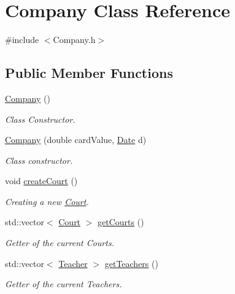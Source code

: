 \hypertarget{class_company}{}\section{Company Class Reference}
\label{class_company}


{\ttfamily \#include $<$Company.\+h$>$}

\subsection*{Public Member Functions}
\begin{DoxyCompactItemize}
\item 
\mbox{\label{class_company_a29937dda711b09df306ae7ca9b3d6b42}} 
\mbox{\hyperlink{class_company_a29937dda711b09df306ae7ca9b3d6b42}{Company}} ()
\begin{DoxyCompactList}\small\item\em Class Constructor. \end{DoxyCompactList}\item 
\mbox{\hyperlink{class_company_ac038a4c5e02f13a7bab9b5139990316e}{Company}} (double card\+Value, \mbox{\hyperlink{class_date}{Date}} d)
\begin{DoxyCompactList}\small\item\em Class constructor. \end{DoxyCompactList}\item 
\mbox{\label{class_company_a10770d690a59f9b4d9f84de6d0f527c9}} 
void \mbox{\hyperlink{class_company_a10770d690a59f9b4d9f84de6d0f527c9}{create\+Court}} ()
\begin{DoxyCompactList}\small\item\em Creating a new \mbox{\hyperlink{class_court}{Court}}. \end{DoxyCompactList}\item 
std\+::vector$<$ \mbox{\hyperlink{class_court}{Court}} $>$ \mbox{\hyperlink{class_company_afa0ab125a0ba718fe2c13802fe1703be}{get\+Courts}} ()
\begin{DoxyCompactList}\small\item\em Getter of the current Courts. \end{DoxyCompactList}\item 
std\+::vector$<$ \mbox{\hyperlink{class_teacher}{Teacher}} $>$ \mbox{\hyperlink{class_company_a000159ce012318a6edf0335447ad8bde}{get\+Teachers}} ()
\begin{DoxyCompactList}\small\item\em Getter of the current Teachers. \end{DoxyCompactList}\item 

\end{DoxyCompactItemize}
